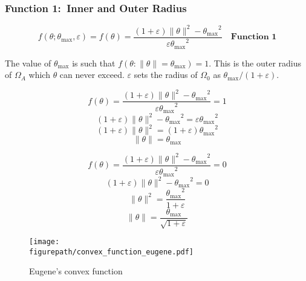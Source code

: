 \subsubsection{Function 1:\ Inner and Outer Radius}

\begin{equation*}
  f(\theta;{\theta_{\text{max}}},\varepsilon)=f(\theta)=\frac{(1+\varepsilon)\|\theta\|^{2}-{\theta_{\text{max}}}^{2}}{\varepsilon{\theta_{\text{max}}}^{2}}\quad\textbf{Function 1}
\end{equation*}

The value of $\theta_{\text{max}}$ is such that $f(\theta:\|\theta\|=\theta_{\text{max}})=1$.
This is the outer radius of $\Omega_{A}$ which $\theta$ can never exceed.
$\varepsilon$ sets the radius of $\Omega_{0}$ as $\theta_{\text{max}}/(1+\varepsilon)$.

\begin{equation*}
  f(\theta)=\frac{(1+\varepsilon)\|\theta\|^{2}-{\theta_{\text{max}}}^{2}}{\varepsilon{\theta_{\text{max}}}^{2}}=1
\end{equation*}
\begin{equation*}
  (1+\varepsilon)\|\theta\|^{2}-{\theta_{\text{max}}}^{2}=\varepsilon{\theta_{\text{max}}}^{2}
\end{equation*}
\begin{equation*}
  (1+\varepsilon)\|\theta\|^{2}=(1+\varepsilon){\theta_{\text{max}}}^{2}
\end{equation*}
\begin{equation*}
  \|\theta\|=\theta_{\text{max}}
\end{equation*}

\begin{equation*}
  f(\theta)=\frac{(1+\varepsilon)\|\theta\|^{2}-{\theta_{\text{max}}}^{2}}{\varepsilon{\theta_{\text{max}}}^{2}}=0
\end{equation*}
\begin{equation*}
  (1+\varepsilon)\|\theta\|^{2}-{\theta_{\text{max}}}^{2}=0
\end{equation*}
\begin{equation*}
  \|\theta\|^{2}=\frac{{\theta_{\text{max}}}^{2}}{1+\varepsilon}
\end{equation*}
\begin{equation*}
  \|\theta\|=\frac{\theta_{\text{max}}}{\sqrt{1+\varepsilon}}
\end{equation*}

\begin{figure}[H]
  \begin{center}
    \texttt{[image: \\figurepath/convex\_function\_eugene.pdf]}
    \caption{Eugene's convex function}
  \end{center}
\end{figure}

